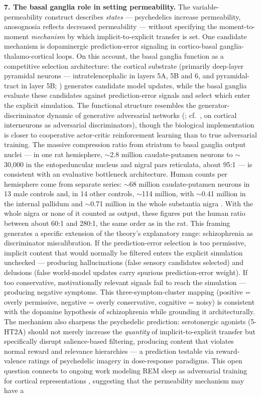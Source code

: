 \documentclass[12pt]{article}
\begin{document}
\textbf{7. The basal ganglia role in setting permeability.} The variable-permeability construct describes \emph{states} --- psychedelics increase permeability, anosognosia reflects decreased permeability --- without specifying the moment-to-moment \emph{mechanism} by which implicit-to-explicit transfer is set. One candidate mechanism is dopaminergic prediction-error signaling in cortico-basal ganglia-thalamo-cortical loops. On this account, the basal ganglia function as a competitive selection architecture: the cortical substrate (primarily deep-layer pyramidal neurons --- intratelencephalic in layers 5A, 5B and 6, and pyramidal-tract in layer 5B; \citealp{Shepherd2013}) generates candidate model updates, while the basal ganglia evaluate these candidates against prediction-error signals and select which enter the explicit simulation. The functional structure resembles the generator-discriminator dynamic of generative adversarial networks (\citealp{Gershman2019,Lau2022}; cf.\ \citealp{BenjaminKording2023}, on cortical interneurons as adversarial discriminators), though the biological implementation is closer to cooperative actor-critic reinforcement learning than to true adversarial training. The massive compression ratio from striatum to basal ganglia output nuclei --- in one rat hemisphere, $\sim$2.8 million caudate-putamen neurons to $\sim$30,000 in the entopeduncular nucleus and nigral pars reticulata, about 95:1 \citep{Oorschot1996} --- is consistent with an evaluative bottleneck architecture. Human counts per hemisphere come from separate series: $\sim$68 million caudate-putamen neurons in 13 male controls \citep{Kreczmanski2007} and, in 14 other controls, $\sim$114 million, with $\sim$0.41 million in the internal pallidum and $\sim$0.71 million in the whole substantia nigra \citep{Wegiel2014}. With the whole nigra or none of it counted as output, these figures put the human ratio between about 60:1 and 280:1, the same order as in the rat. This framing generates a specific extension of the theory's explanatory range: schizophrenia as discriminator miscalibration. If the prediction-error selection is too permissive, implicit content that would normally be filtered enters the explicit simulation unchecked --- producing hallucinations (false sensory candidates selected) and delusions (false world-model updates carry spurious prediction-error weight). If too conservative, motivationally relevant signals fail to reach the simulation --- producing negative symptoms. This three-symptom-cluster mapping (positive = overly permissive, negative = overly conservative, cognitive = noisy) is consistent with the dopamine hypothesis of schizophrenia \citep{HowesKapur2009} while grounding it architecturally. The mechanism also sharpens the psychedelic prediction: serotonergic agonists (5-HT2A) should not merely increase the \emph{quantity} of implicit-to-explicit transfer but specifically disrupt salience-based filtering, producing content that violates normal reward and relevance hierarchies --- a prediction testable via reward-valence ratings of psychedelic imagery in dose-response paradigms. This open question connects to ongoing work modeling REM sleep as adversarial training for cortical representations \citep{Deperrois2022}, suggesting that the permeability mechanism may have a 
\end{document}
